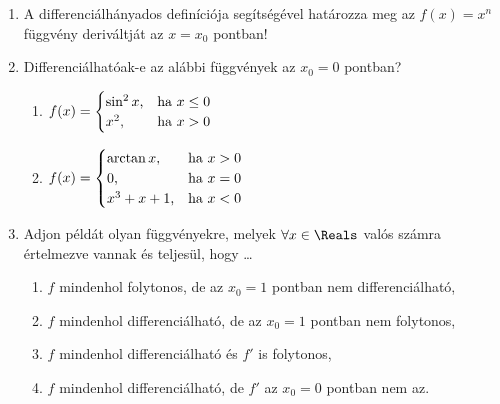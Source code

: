 \documentclass[a4paper, 12pt]{scrartcl}
\begin{document}
\begin{enumerate}
  \item A differenciálhányados definíciója segítségével határozza meg az
        $f(x) = x^n$ függvény deriváltját az $x = x_0$ pontban!

  \item Differenciálhatóak-e az alábbi függvények az $x_0 = 0$ pontban?
        \begin{multicols}{2}
          \begin{enumerate}
            \item $\displaystyle
                    f(x) = \begin{cases}
                      \sin^2 x\text, & \text{ha } x \leq 0 \\
                      x^2 \text,     & \text{ha } x > 0    \\
                    \end{cases}
                  $

            \item $\displaystyle
                    f(x) = \begin{cases}
                      \arctan x \text,   & \text{ha } x > 0 \\
                      0 \text,           & \text{ha } x = 0 \\
                      x^3 + x + 1 \text, & \text{ha } x < 0 \\
                    \end{cases}
                  $
          \end{enumerate}
        \end{multicols}

  \item Adjon példát olyan függvényekre, melyek $\forall x \in \Reals$ valós
        számra értelmezve vannak és teljesül, hogy \dots
        \begin{enumerate}
          \item $f$ mindenhol folytonos, de az $x_0 = 1$ pontban nem
                differenciálható,
          \item $f$ mindenhol differenciálható, de az $x_0 = 1$ pontban nem
                folytonos,
          \item $f$ mindenhol differenciálható és $f'$ is folytonos,
          \item $f$ mindenhol differenciálható, de $f'$ az $x_0 = 0$ pontban nem
                az.
        \end{enumerate}


\end{enumerate}
\end{document}

